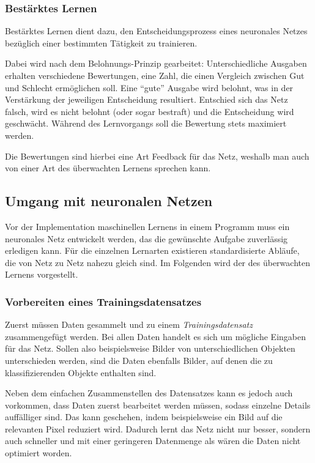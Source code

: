 \documentclass[12pt,a4]{article}
\begin{document}
\subsubsection{Bestärktes Lernen}\label{sec:ReinforcementLearning}
Bestärktes Lernen dient dazu, den Entscheidungsprozess eines neuronales Netzes bezüglich einer bestimmten Tätigkeit zu trainieren.

Dabei wird nach dem Belohnungs-Prinzip gearbeitet: Unterschiedliche Ausgaben erhalten verschiedene Bewertungen, eine Zahl, die einen Vergleich zwischen Gut und Schlecht ermöglichen soll. Eine \enquote{gute} Ausgabe wird belohnt, was in der Verstärkung der jeweiligen Entscheidung resultiert. Entschied sich das Netz falsch, wird es nicht belohnt (oder sogar bestraft) und die Entscheidung wird geschwächt.
Während des Lernvorgangs soll die Bewertung stets maximiert werden.

Die Bewertungen sind hierbei eine Art Feedback für das Netz, weshalb man auch von einer Art des überwachten Lernens sprechen kann.

\subsection{Umgang mit neuronalen Netzen \cite{PythonMachineLearningChapter1}}\label{sec:HandlingNetworks}
Vor der Implementation maschinellen Lernens in einem Programm muss ein neuronales Netz entwickelt werden, das die gewünschte Aufgabe zuverlässig erledigen kann. Für die einzelnen Lernarten existieren standardisierte Abläufe, die von Netz zu Netz nahezu gleich sind. Im Folgenden wird der des überwachten Lernens vorgestellt.

\subsubsection{Vorbereiten eines Trainingsdatensatzes}\label{sec:TrainingData}
Zuerst müssen Daten gesammelt und zu einem \textit{Trainingsdatensatz} zusammengefügt werden.
Bei allen Daten handelt es sich um mögliche Eingaben für das Netz. Sollen also beispielsweise Bilder von unterschiedlichen Objekten unterschieden werden, sind die Daten ebenfalls Bilder, auf denen die zu klassifizierenden Objekte enthalten sind.

Neben dem einfachen Zusammenstellen des Datensatzes kann es jedoch auch vorkommen, dass Daten zuerst bearbeitet werden müssen, sodass einzelne Details auffälliger sind. Das kann geschehen, indem beispielsweise ein Bild auf die relevanten Pixel reduziert wird. Dadurch lernt das Netz nicht nur besser, sondern auch schneller und mit einer geringeren Datenmenge als wären die Daten nicht optimiert worden.
\end{document}
